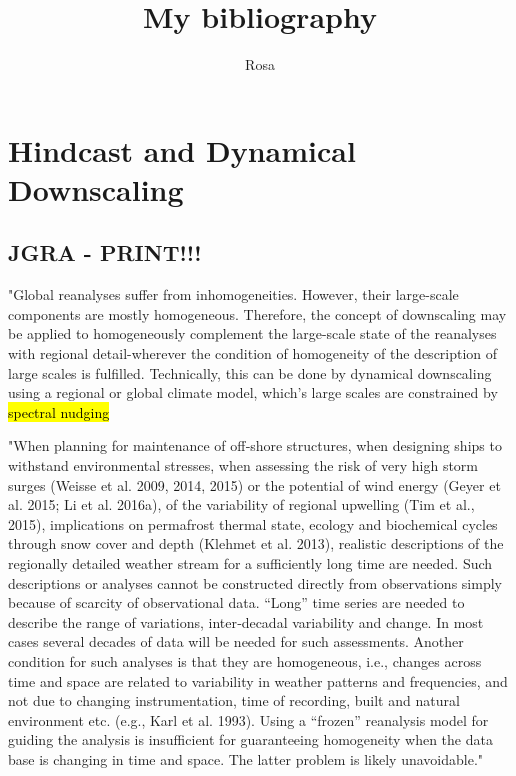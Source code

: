 \documentclass[12pt,a4paper]{article}
\title{My bibliography}
\author{Rosa}
\begin{document}
\maketitle
\tableofcontents

\section{Hindcast and Dynamical Downscaling }

\subsection{\cite{VonStorch2017} JGRA - PRINT!!!}

"Global reanalyses suffer from inhomogeneities. However, their large-scale components are mostly homogeneous. Therefore, the concept of downscaling may be applied to homogeneously complement the large-scale state of the reanalyses with regional detail-wherever the condition of homogeneity of the description of large scales is fulfilled. Technically, this can be done by dynamical downscaling using a regional or global climate model, which's large scales are constrained by \hl{spectral nudging}

"When planning for maintenance of off‐shore structures, when designing ships to withstand environmental stresses, when assessing the risk of very high storm surges (Weisse et al. 2009, 2014, 2015) or the potential of wind energy (Geyer et al. 2015; Li et al. 2016a), of the variability of regional upwelling (Tim et al., 2015), implications on permafrost thermal state, ecology and biochemical cycles through snow cover and depth (Klehmet et al. 2013), realistic descriptions of the regionally detailed weather stream for a sufficiently long time are needed. Such descriptions or analyses cannot be constructed directly from observations simply because of scarcity of observational data. “Long” time series are needed to describe the range of variations, inter‐decadal variability and change. In most cases several decades of data will be needed for such assessments. Another condition for such analyses is that they are homogeneous, i.e., changes across time and space are related to variability in weather patterns and frequencies, and not due to changing instrumentation, time of recording, built and natural environment etc. (e.g., Karl et al. 1993). Using a “frozen” reanalysis model for guiding the analysis is insufficient for guaranteeing homogeneity when the data base is changing in time and space. The latter problem is likely unavoidable."
\end{document}
